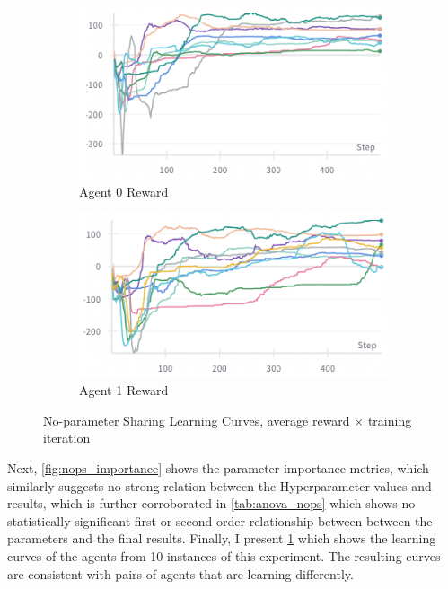 \documentclass[12pt,letterpaper]{exam}
\begin{document}
\begin{questions}
    \begin{figure}%
        \begin{subfigure}{.48\textwidth}
            \centering
            \includegraphics[width=\linewidth]{learn_curve_nops_0.png}
            \caption{Agent 0 Reward}
        \end{subfigure}
        \begin{subfigure}{.48\textwidth}
            \centering
            \includegraphics[width=\linewidth]{learn_curve_nops_1.png}
            \caption{Agent 1 Reward}
        \end{subfigure}
        \caption{No-parameter Sharing Learning Curves, 
            average reward \(\times\) training iteration}
        \label{fig:nops_learn_curves}
    \end{figure}

    Next, \cref{fig:nops_importance} shows the parameter importance metrics,
    which similarly suggests no strong relation between the Hyperparameter
    values and results, which is further corroborated in \cref{tab:anova_nops}
    which shows no statistically significant first or second order
    relationship between between the parameters and the final results.
%
    Finally, I present \cref{fig:nops_learn_curves} which shows the learning 
    curves of the agents from 10 instances of this experiment. 
    The resulting curves are consistent with pairs of agents that are
    learning differently. \\ \\ 


\end{questions}
\end{document}
